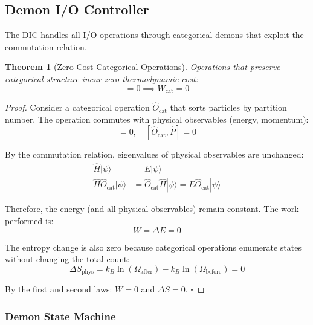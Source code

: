 \documentclass[twocolumn,10pt]{article}
\newtheorem{theorem}{Theorem}[section]
\theoremstyle{definition}
\theoremstyle{remark}
\begin{document}
\subsection{Demon I/O Controller}

The DIC handles all I/O operations through categorical demons that exploit the commutation relation.

\begin{theorem}[Zero-Cost Categorical Operations]
\label{thm:zero_cost}
Operations that preserve categorical structure incur zero thermodynamic cost:
\begin{equation}
    [\hat{O}_{\text{cat}}, \hat{O}_{\text{phys}}] = 0 \implies W_{\text{cat}} = 0
\end{equation}
\end{theorem}

\begin{proof}
Consider a categorical operation $\hat{O}_{\text{cat}}$ that sorts particles by partition number. The operation commutes with physical observables (energy, momentum):
\begin{equation}
    [\hat{O}_{\text{cat}}, \hat{H}] = 0, \quad [\hat{O}_{\text{cat}}, \hat{P}] = 0
\end{equation}

By the commutation relation, eigenvalues of physical observables are unchanged:
\begin{align}
    \hat{H}|\psi\rangle &= E|\psi\rangle \\
    \hat{H}\hat{O}_{\text{cat}}|\psi\rangle &= \hat{O}_{\text{cat}}\hat{H}|\psi\rangle = E \hat{O}_{\text{cat}}|\psi\rangle
\end{align}

Therefore, the energy (and all physical observables) remain constant. The work performed is:
\begin{equation}
    W = \Delta E = 0
\end{equation}

The entropy change is also zero because categorical operations enumerate states without changing the total count:
\begin{equation}
    \Delta S_{\text{phys}} = k_B \ln(\Omega_{\text{after}}) - k_B \ln(\Omega_{\text{before}}) = 0
\end{equation}

By the first and second laws: $W = 0$ and $\Delta S = 0$. $\square$
\end{proof}

\subsubsection{Demon State Machine}
\end{document}
